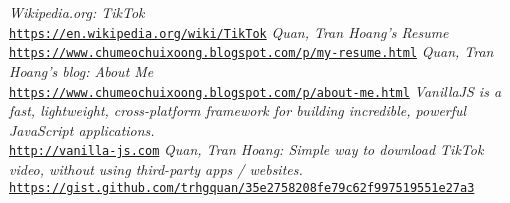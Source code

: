 \documentclass{article}
\begin{document}
\medskip
\begin{thebibliography}{9}
\textit{Wikipedia.org: TikTok}
\\\texttt{\href{https://en.wikipedia.org/wiki/TikTok}{https://en.wikipedia.org/wiki/TikTok}}
\textit{Quan, Tran Hoang's Resume}
\\\texttt{\href{https://www.chumeochuixoong.blogspot.com/p/my-resume.html}{https://www.chumeochuixoong.blogspot.com/p/my-resume.html}}
\textit{Quan, Tran Hoang's blog: About Me}
\\\texttt{\href{https://www.chumeochuixoong.blogspot.com/p/about-me.html}{https://www.chumeochuixoong.blogspot.com/p/about-me.html}}
\textit{VanillaJS is a fast, lightweight, cross-platform framework
 for building incredible, powerful JavaScript applications.}
\\\texttt{\href{http://vanilla-js.com}{http://vanilla-js.com}}
\textit{Quan, Tran Hoang: Simple way to download TikTok video, without using third-party apps / websites. }
\\\texttt{\href{https://gist.github.com/trhgquan/35e2758208fe79c62f997519551e27a3}{https://gist.github.com/trhgquan/35e2758208fe79c62f997519551e27a3}}
\end{thebibliography}
\end{document}
